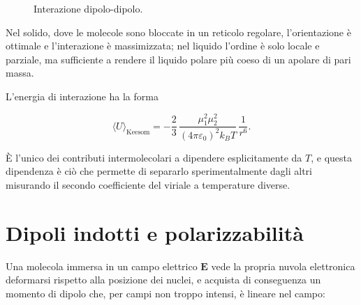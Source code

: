 \begin{figure}[htbp]
    \centering
    \caption{Interazione dipolo-dipolo.}
    \label{fig:dipolo-dipolo}
\end{figure}

Nel solido, dove le molecole sono bloccate in un reticolo regolare, l'orientazione è ottimale e l'interazione è massimizzata; nel liquido l'ordine è solo locale e parziale, ma sufficiente a rendere il liquido polare più coeso di un apolare di pari massa.

L'energia di interazione ha la forma 

\begin{equation}
    \langle U \rangle_{\text{Keesom}} = -\frac{2}{3}\,\frac{\mu_1^2\mu_2^2}{(4\pi\varepsilon_0)^2 k_B T}\,\frac{1}{r^6}.
    \label{eq:keesom}
\end{equation}

È l'unico dei contributi intermolecolari a dipendere esplicitamente da $T$, e questa dipendenza è ciò che permette di separarlo sperimentalmente dagli altri misurando il secondo coefficiente del viriale a temperature diverse.

\section{Dipoli indotti e polarizzabilità}

Una molecola immersa in un campo elettrico $\mathbf{E}$ vede la propria nuvola elettronica deformarsi rispetto alla posizione dei nuclei, e acquista di conseguenza un momento di dipolo che, per campi non troppo intensi, è lineare nel campo:

